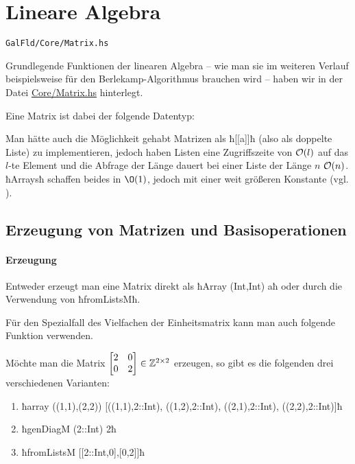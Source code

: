 \section{Lineare Algebra}
\label{sec:linalg}

\texttt{GalFld/Core/Matrix.hs}

Grundlegende Funktionen der linearen Algebra -- wie man sie im weiteren Verlauf
beispielsweise für den Berlekamp-Algorithmus brauchen wird -- haben wir in der
Datei \url{Core/Matrix.hs} hinterlegt.

Eine Matrix ist dabei der folgende Datentyp:


Man hätte auch die Möglichkeit gehabt Matrizen als ħ[[a]]ħ (also als doppelte
Liste) zu implementieren, jedoch haben Listen eine Zugriffszeite von $\mathcal{O}(l)$ auf
das $l$-te Element und die Abfrage der Länge dauert bei einer Liste der Länge
$n$ $\mathcal{O}(n)$. ħArraysħ schaffen beides in $\O(1)$, jedoch mit einer
weit größeren Konstante (vgl. \url{}). 

\subsection{Erzeugung von Matrizen und Basisoperationen}

\paragraph{Erzeugung} Entweder erzeugt man eine Matrix direkt als
ħArray (Int,Int) aħ oder durch die Verwendung von ħfromListsMħ.


Für den Spezialfall des Vielfachen der Einheitsmatrix kann man auch folgende
Funktion verwenden.


\begin{beispiel}
  Möchte man die Matrix $\begin{bmatrix} 2 & 0 \\ 0 & 2 \end{bmatrix} \in
  \mathbb{Z}^{2\times 2}$
  erzeugen, so gibt es die folgenden drei verschiedenen Varianten:
  \begin{enumerate}
    \item ħarray ((1,1),(2,2)) [((1,1),2::Int), ((1,2),2::Int), ((2,1),2::Int), ((2,2),2::Int)]ħ
    \item ħgenDiagM (2::Int) 2ħ
    \item ħfromListsM [[2::Int,0],[0,2]]ħ
  \end{enumerate}
\end{beispiel}

